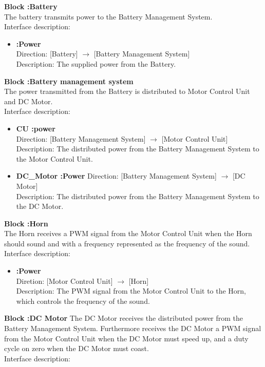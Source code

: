 \textbf{Block :Battery}\\
The battery transmits power to the Battery Management System.\\Interface description:

\begin{itemize}
	\item \textbf{:Power}\\
		Direction: [Battery] $\rightarrow$ [Battery Management System]\\
		Description: The supplied power from the Battery.
\end{itemize}

\textbf{Block :Battery management system}\\
The power transmitted from the Battery is distributed to Motor Control Unit and DC Motor.\\
Interface description:

\begin{itemize}
	\item \textbf{CU :power}\\
		Direction: [Battery Management System] $\rightarrow$ [Motor Control Unit]\\
		Description: The distributed power from the Battery Management System to the Motor Control Unit.
	\item \textbf{DC\_Motor :Power}
		Direction: [Battery Management System] $\rightarrow$ [DC Motor]\\
		Description: The distributed power from the Battery Management System to the DC Motor.
\end{itemize}

\textbf{Block :Horn}\\
The Horn receives a PWM signal from the Motor Control Unit when the Horn should sound and with a frequency represented as the frequency of the sound.\\
Interface description:

\begin{itemize}
	\item \textbf{:Power}\\
		Diretion: [Motor Control Unit] $\rightarrow$ [Horn]\\
		Description: The PWM signal from the Motor Control Unit to the Horn, which controls the frequency of the sound.
\end{itemize}

\textbf{Block :DC Motor}
The DC Motor receives the distributed power from the Battery Management System. Furthermore receives the DC Motor a PWM signal from the Motor Control Unit when the DC Motor must speed up, and a duty cycle on zero when the DC Motor must coast.\\
Interface description:

